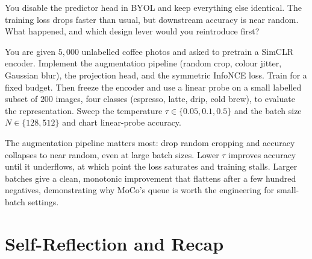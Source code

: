 \vspace{2.5em}

 You disable the predictor head in BYOL and keep everything else identical. The training loss drops faster than usual, but downstream accuracy is near random. What happened, and which design lever would you reintroduce first?


\vspace{2.5em}



 You are given $5{,}000$ unlabelled coffee photos and asked to pretrain a SimCLR encoder. Implement the augmentation pipeline (random crop, colour jitter, Gaussian blur), the projection head, and the symmetric InfoNCE loss. Train for a fixed budget. Then freeze the encoder and use a linear probe on a small labelled subset of $200$ images, four classes (espresso, latte, drip, cold brew), to evaluate the representation. Sweep the temperature $\tau \in \{0.05, 0.1, 0.5\}$ and the batch size $N \in \{128, 512\}$ and chart linear-probe accuracy.

 The augmentation pipeline matters most: drop random cropping and accuracy collapses to near random, even at large batch sizes. Lower $\tau$ improves accuracy until it underflows, at which point the loss saturates and training stalls. Larger batches give a clean, monotonic improvement that flattens after a few hundred negatives, demonstrating why MoCo's queue is worth the engineering for small-batch settings.


\section{Self-Reflection and Recap}

